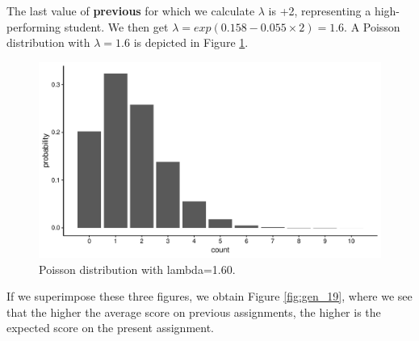\documentclass[]{book}\usepackage[]{graphicx}\usepackage[]{color}
\makeatletter
\def\maxwidth{ %
  \ifdim\Gin@nat@width>\linewidth
    \linewidth
  \else
    \Gin@nat@width
  \fi
}
\newenvironment{knitrout}{}{} %
\makeatother
\begin{document}
The last value of \textbf{previous} for which we calculate $\lambda$ is +2, representing a high-performing student. We then get $\lambda=exp(0.158  -0.055 \times 2)= 1.6$. A Poisson distribution with $\lambda=1.6$ is depicted in Figure \ref{fig:gen_18}.

\begin{knitrout}
\color{fgcolor}\begin{figure}

{\centering \includegraphics[width=\maxwidth]{figure/gen_18-1} 

}

\caption[Poisson distribution with lambda=1.60]{Poisson distribution with lambda=1.60.}\label{fig:gen_18}
\end{figure}


\end{knitrout}


If we superimpose these three figures, we obtain Figure \ref{fig:gen_19}, where we see that the higher the average score on previous assignments, the higher is the expected score on the present assignment.
\end{document}

